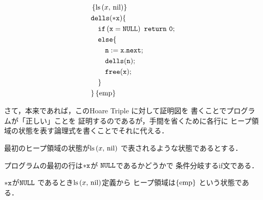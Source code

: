 \documentclass[a4paper, 10pt]{ltjsarticle}
\begin{document}
    \begin{align*}
     &  \left\{\mathprls{x}{\mathvalnil}\right\}\\
     & \mathprogramsy{dells(*x)} \{  \\
     &\quad \mathprogramsy{if\left(x = NULL\right)\ return\ 0;} %
   \\
     &\quad   \mathprogramsy{else \{}  %
   \\
     &\qquad  \mathprogramsy{n := x.next;}  %
   \\
     &\qquad  \mathprogramsy{dells(n);}  %
   \\
      &\qquad  \mathprogramsy{free(x);}   %
   \\
      &\quad \mathprogramsy{\}} %
   \\
      &\mathprogramsy{\}} \left\{\mathemp\right\}
  \end{align*}
  
  さて，本来であれば，このHoare Triple に対して証明図を
  書くことでプログラムが「正しい」ことを
  証明するのであるが，手間を省くために各行に
  ヒープ領域の状態を表す論理式を書くことでそれに代える．
  
  最初のヒープ領域の状態が$\mathop{\mathrm{ls}}\left(x{,}\ \mathrm{nil}\right)$
  で表されるような状態であるとする．

  プログラムの最初の行は$\mathtt{*x}$が
  $\mathtt{NULL}$であるかどうかで
  条件分岐するif文である．

  $\mathtt{*x}$が$\mathtt{NULL}$
  であるとき$\mathop{\mathrm{ls}}\left(x{,}\ \mathrm{nil}\right)$定義から
  ヒープ領域は$\left\{\mathrm{emp}\right\}$
  という状態である．
\end{document}
